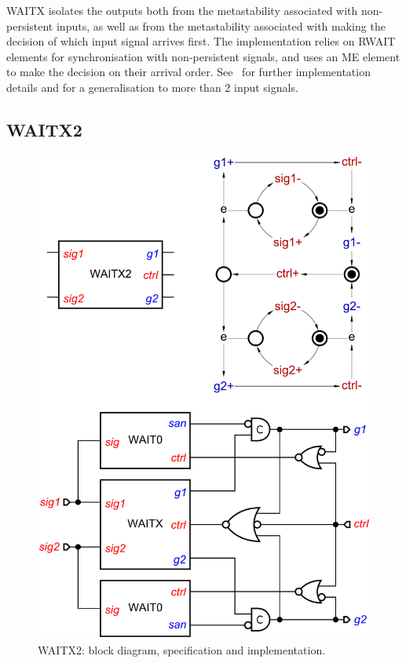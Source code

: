 \documentclass[conference]{IEEEtran}
\begin{document}
\textsf{WAITX} isolates the outputs
both from the metastability associated with non-persistent inputs, as well as from
the metastability associated with making the decision of which input signal arrives first.
The implementation relies on \textsf{RWAIT} elements for synchronisation with
non-persistent signals, and uses an \textsf{ME} element to make the decision on their
arrival order. See~\cite{2017_khomenko_waitx} for further implementation details and for a
generalisation to more than 2 input signals.

\subsection*{\textsf{WAITX2}}

\begin{figure}
\begin{center}
    \vspace{-2mm}
    \includegraphics[scale=0.23]{fig/WAITX2.pdf}
    \caption{\textsf{WAITX2}: block diagram, specification and implementation.}
    \label{fig:waitx2}
    \vspace{-7mm}
\end{center}
\end{figure}
\end{document}

